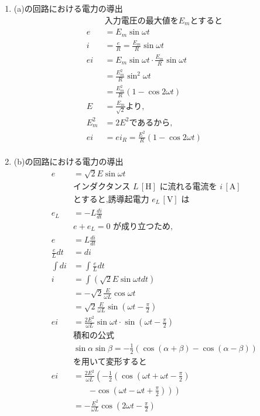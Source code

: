 \documentclass[twocolumn]{article}
\begin{document}
\begin{enumerate}
  \item (a)の回路における電力の導出
    \begin{align*}
    &\text{入力電圧の最大値を} E_m \text{とすると}\\
    e     &= E_m \sin \omega t \\ 
    i     &= \frac{e}{R} = \frac{E_m}{R} \sin \omega t \\ 
    ei    &= E_m \sin \omega t \cdot \frac{E_m}{R} \sin \omega t \\ 
          &= \frac{E_m^2}{R} \sin^2 \omega t \\ 
          &= \frac{E_m^2}{R} \left( 1 - \cos 2 \omega t \right) \\ 
    E     &= \frac{E_m}{\sqrt{2}} \text{より,} \\ 
    E_m^2 &= 2E^2 \text{であるから,} \\ 
    ei    &= ei_R = \frac{E^2}{R} \left( 1 - \cos 2 \omega t \right) \\
    \end{align*}

  \item (b)の回路における電力の導出
    \begin{align*}
    e &= \sqrt{2}E \sin \omega t \\ 
    &\text{インダクタンス } L\,[\text{H}] \text{ に流れる電流を } i\,[\text{A}] \\
    &\text{とすると,誘導起電力 } e_L\,[\text{V}] \text{ は} \\
    e_L &= -L \frac{di}{dt} \\
    &e + e_L = 0 \text{ が成り立つため,} \\
    e &= L \frac{di}{dt} \\ 
    \frac{e}{L} dt &= di \\ 
    \int di &= \int \frac{e}{L} dt \\ 
    i &= \int \left(\sqrt{2} E \sin \omega t dt\right) \\ 
      &= - \sqrt{2} \frac{E}{\omega L} \cos \omega t \\ 
      &= \sqrt{2}\frac{E}{\omega L}\sin \left(\omega t - \frac{\pi}{2}\right) \\ 
    ei  &= \frac{2E^2}{\omega L}\sin \omega t \cdot \sin \left(\omega t - \frac{\pi}{2}\right) \\
    &\text{積和の公式} \\
    &\sin\alpha \sin \beta = -\frac{1}{2} \left( \cos \left(\alpha + \beta\right) - \cos \left(\alpha - \beta\right) \right)\\
    &\text{を用いて変形すると}\\
    ei  &= \frac{2E^2}{\omega L} \left(- \frac{1}{2} \left(\cos\left(\omega t + \omega t - \frac{\pi}{2}\right) \right. \right. \\
        &  \qquad\left.\left. - \cos\left(\omega t - \omega t + \frac{\pi}{2}\right) 
        \right) \right)\\
        &= -\frac{E^2}{\omega L} \cos \left(2\omega t - \frac{\pi}{2}\right) 
    \end{align*}


\end{enumerate}
\end{document}
